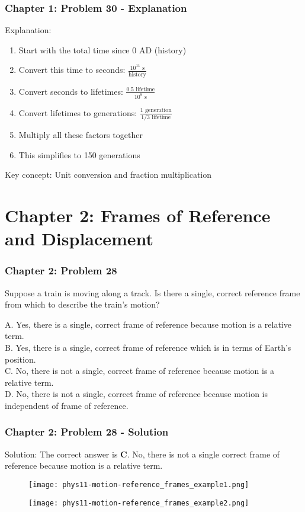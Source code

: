\documentclass{beamer}
\begin{document}
\begin{frame}
\frametitle{Chapter 1: Problem 30 - Explanation}
Explanation:
\begin{enumerate}
    \item Start with the total time since 0 AD (history)
    \item Convert this time to seconds: $\frac{10^{11} \text{ s}}{\text{history}}$
    \item Convert seconds to lifetimes: $\frac{0.5 \text{ lifetime}}{10^{9} \text{ s}}$
    \item Convert lifetimes to generations: $\frac{1 \text{ generation}}{1/3 \text{ lifetime}}$
    \item Multiply all these factors together
    \item This simplifies to 150 generations
\end{enumerate}
Key concept: Unit conversion and fraction multiplication
\end{frame}

\section{Chapter 2: Frames of Reference and Displacement}

\begin{frame}
\frametitle{Chapter 2: Problem 28}
Suppose a train is moving along a track. Is there a single, correct reference frame from which to describe the train's motion?

A. Yes, there is a single, correct frame of reference because motion is a relative term.\\
B. Yes, there is a single, correct frame of reference which is in terms of Earth's position.\\
C. No, there is not a single, correct frame of reference because motion is a relative term.\\
D. No, there is not a single, correct frame of reference because motion is independent of frame of reference.
\end{frame}

\begin{frame}
\frametitle{Chapter 2: Problem 28 - Solution}
Solution: The correct answer is \textbf{C}. No, there is not a single correct frame of reference because motion is a relative term.
\begin{figure}
    \centering
    \texttt{[image: phys11-motion-reference\_frames\_example1.png]}
\end{figure}
\begin{figure}
    \centering
    \texttt{[image: phys11-motion-reference\_frames\_example2.png]}
\end{figure}
\end{frame}
\end{document}
